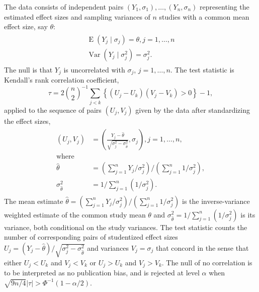 \documentclass[12pt]{article}
\newcommand{\y}{Y}
\renewcommand{\u}{U}
\renewcommand{\v}{V}
\DeclareMathOperator{\E}{E}
\DeclareMathOperator{\V}{Var}
\begin{document}
    The data consists of independent pairs
    $(\y_1,\sigma_1),\ldots,(\y_n,\sigma_n)$ representing the estimated
    effect sizes and sampling variances of $n$ studies with a common mean effect size, say $\theta$:
    \begin{align}
      \begin{split}
      \E(\y_j\mid\sigma_j)=\theta, j=1,\ldots,n\\
      \V(\y_j\mid\sigma_j^2)=\sigma_j^2.
      \label{model:nonpara}
    \end{split}
    \end{align}
    The null is that $\y_j$ is uncorrelated with $\sigma_j$, $j=1,\ldots,n$.
    The test statistic is Kendall's rank
    correlation coefficient,
    $$
    \tau=2{n\choose 2}^{-1}\sum_{j<k}\left\{(\u_j-\u_k)(\v_j-\v_k)>0\right\} - 1,
    $$
    applied to the sequence of pairs $(\u_j,\v_j)$ given by the data after standardizing the effect sizes,
    \begin{align}
      \begin{split}\label{defn:pairs}
        (\u_j,\v_j)&=\left(\frac{\y_j-\hat{\theta}}{\sqrt{\sigma_j^2-\sigma^2_{\hat{\theta}}}},\sigma_j\right),j=1,\ldots,n,\\
        \text{where}\\
        \hat{\theta}&=(\sum_{j=1}^n\y_j/\sigma^2_j)/(\sum_{j=1}^n1/\sigma_j^2),\\
        \sigma^2_{\hat{\theta}}&=1/\sum_{j=1}^n(1/\sigma_j^2).
      \end{split}
    \end{align}
    The mean estimate
    $\hat{\theta}=(\sum_{j=1}^n\y_j/\sigma^2_j)/(\sum_{j=1}^n1/\sigma_j^2)$
    is the inverse-variance weighted estimate of the common study mean
    $\theta$ and $\sigma^2_{\hat{\theta}}=1/\sum_{j=1}^n(1/\sigma_j^2)$
    is its variance, both conditional on the study variances.  The
    test statistic counts the number of corresponding pairs of
    studentized effect sizes
    $\u_j=(\y_j-\hat{\theta})/\sqrt{\sigma_j^2-\sigma^2_{\hat{\theta}}}$
    and variances $\v_j=\sigma_j$ that concord in
    the sense that either $\u_j<\u_k$ and $\v_j<\v_k$ or $\u_j>\u_k$ and
    $\v_j>\v_k$. The null of no correlation is to be interpreted as no
    publication bias, and is rejected at level $\alpha$ when
    $\sqrt{9n/4}|\tau| > \Phi^{-1}(1-\alpha/2)$. %
\end{document}
